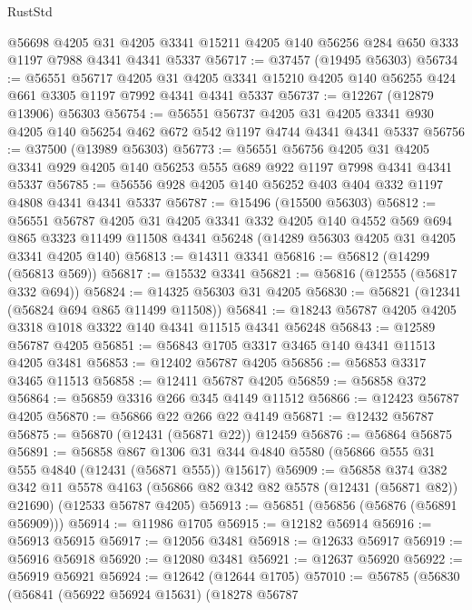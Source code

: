 \begin{lexlean}{RustStd}
\begin{coremodule}
    @56698
    @4205
    @31
    @4205
    @3341
    @15211
    @4205
    @140
    @56256
    @284
    @650
    @333
    @1197
    @7988
    @4341
    @4341
    @5337
@56717 := @37457 (@19495 @56303)
@56734 := @56551
    @56717
    @4205
    @31
    @4205
    @3341
    @15210
    @4205
    @140
    @56255
    @424
    @661
    @3305
    @1197
    @7992
    @4341
    @4341
    @5337
@56737 := @12267 (@12879 @13906) @56303
@56754 := @56551
    @56737
    @4205
    @31
    @4205
    @3341
    @930
    @4205
    @140
    @56254
    @462
    @672
    @542
    @1197
    @4744
    @4341
    @4341
    @5337
@56756 := @37500 (@13989 @56303)
@56773 := @56551
    @56756
    @4205
    @31
    @4205
    @3341
    @929
    @4205
    @140
    @56253
    @555
    @689
    @922
    @1197
    @7998
    @4341
    @4341
    @5337
@56785 := @56556 @928 @4205 @140 @56252 @403 @404 @332 @1197 @4808 @4341 @4341 @5337
@56787 := @15496 (@15500 @56303)
@56812 := @56551
    @56787
    @4205
    @31
    @4205
    @3341
    @332
    @4205
    @140
    @4552
    @569
    @694
    @865
    @3323
    @11499
    @11508
    @4341
    @56248
    (@14289 @56303 @4205 @31 @4205 @3341 @4205 @140)
@56813 := @14311 @3341
@56816 := @56812 (@14299 (@56813 @569))
@56817 := @15532 @3341
@56821 := @56816 (@12555 (@56817 @332 @694))
@56824 := @14325 @56303 @31 @4205
@56830 := @56821 (@12341 (@56824 @694 @865 @11499 @11508))
@56841 := @18243 @56787 @4205 @4205 @3318 @1018 @3322 @140 @4341 @11515 @4341 @56248
@56843 := @12589 @56787 @4205
@56851 := @56843 @1705 @3317 @3465 @140 @4341 @11513 @4205 @3481
@56853 := @12402 @56787 @4205
@56856 := @56853 @3317 @3465 @11513
@56858 := @12411 @56787 @4205
@56859 := @56858 @372
@56864 := @56859 @3316 @266 @345 @4149 @11512
@56866 := @12423 @56787 @4205
@56870 := @56866 @22 @266 @22 @4149
@56871 := @12432 @56787
@56875 := @56870 (@12431 (@56871 @22)) @12459
@56876 := @56864 @56875
@56891 := @56858
    @867
    @1306
    @31
    @344
    @4840
    @5580
    (@56866 @555 @31 @555 @4840 (@12431 (@56871 @555)) @15617)
@56909 := @56858
    @374
    @382
    @342
    @11
    @5578
    @4163
    (@56866 @82 @342 @82 @5578 (@12431 (@56871 @82)) @21690)
    (@12533 @56787 @4205)
@56913 := @56851 (@56856 (@56876 (@56891 @56909)))
@56914 := @11986 @1705
@56915 := @12182 @56914
@56916 := @56913 @56915
@56917 := @12056 @3481
@56918 := @12633 @56917
@56919 := @56916 @56918
@56920 := @12080 @3481
@56921 := @12637 @56920
@56922 := @56919 @56921
@56924 := @12642 (@12644 @1705)
@57010 := @56785
    (@56830
      (@56841
        (@56922 @56924 @15631)
        (@18278
          @56787

\end{coremodule}
\end{lexlean}
